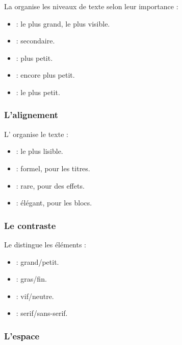 La  organise les niveaux de texte selon leur importance :

\begin{itemize}
    \item {} : le plus grand, le plus visible.
    \item {} : secondaire.
    \item {} : plus petit.
    \item {} : encore plus petit.
    \item {} : le plus petit.
\end{itemize}

\subsubsection{L'alignement}

L' organise le texte :

\begin{itemize}
    \item {} : le plus lisible.
    \item {} : formel, pour les titres.
    \item {} : rare, pour des effets.
    \item {} : élégant, pour les blocs.
\end{itemize}

\subsubsection{Le contraste}

Le  distingue les éléments :

\begin{itemize}
    \item {} : grand/petit.
    \item {} : gras/fin.
    \item {} : vif/neutre.
    \item {} : serif/sans-serif.
\end{itemize}

\subsubsection{L'espace}


